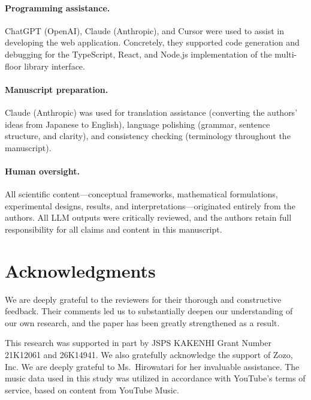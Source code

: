 \documentclass[11pt,a4paper]{article}
\begin{document}
\paragraph{Programming assistance.}
ChatGPT (OpenAI), Claude (Anthropic), and Cursor were used to assist in developing
the web application. Concretely, they supported code generation and debugging
for the TypeScript, React, and Node.js implementation of the multi-floor library interface.

\paragraph{Manuscript preparation.}
Claude (Anthropic) was used for translation assistance (converting the authors' ideas
from Japanese to English), language polishing (grammar, sentence structure, and clarity),
and consistency checking (terminology throughout the manuscript).

\paragraph{Human oversight.}
All scientific content---conceptual frameworks, mathematical formulations, experimental
designs, results, and interpretations---originated entirely from the authors.
All LLM outputs were critically reviewed, and the authors retain full responsibility
for all claims and content in this manuscript.


\section{Acknowledgments}
We are deeply grateful to the reviewers for their thorough and constructive feedback.
Their comments led us to substantially deepen our understanding of our own research,
and the paper has been greatly strengthened as a result.

This research was supported in part by JSPS KAKENHI Grant Number 21K12061 and 26K14941.
We also gratefully acknowledge the support of Zozo, Inc.
We are deeply grateful to Ms.\ Hirowatari for her invaluable assistance.
The music data used in this study was utilized in accordance with YouTube's terms of service,
based on content from YouTube Music.
\end{document}
